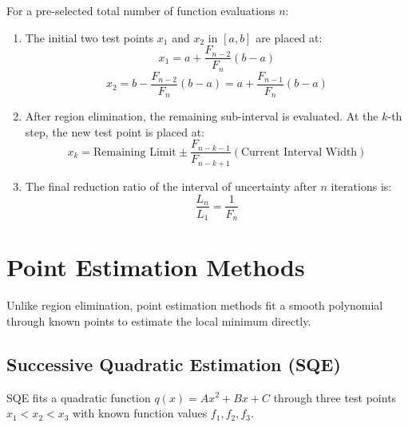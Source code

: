 \documentclass[12pt,a4paper]{article}
\begin{document}
\begin{tcolorbox}[formulabox, title={Fibonacci Search Equations}]
For a pre-selected total number of function evaluations $n$:
\begin{enumerate}[label=\textbf{\arabic*.}, leftmargin=*, itemsep=3pt, topsep=0pt]
  \item The initial two test points $x_1$ and $x_2$ in $[a, b]$ are placed at:
    \begin{equation}
      x_1 = a + \frac{F_{n-2}}{F_n}(b - a)
    \end{equation}
    \begin{equation}
      x_2 = b - \frac{F_{n-2}}{F_n}(b - a) = a + \frac{F_{n-1}}{F_n}(b - a)
    \end{equation}
  \item After region elimination, the remaining sub-interval is evaluated. At the $k$-th step, the new test point is placed at:
    \begin{equation}
      x_k = \text{Remaining Limit} \pm \frac{F_{n-k-1}}{F_{n-k+1}}(\text{Current Interval Width})
    \end{equation}
  \item The final reduction ratio of the interval of uncertainty after $n$ iterations is:
    \begin{equation}
      \frac{L_n}{L_1} = \frac{1}{F_n}
    \end{equation}
\end{enumerate}
\end{tcolorbox}

\section{Point Estimation Methods}

Unlike region elimination, point estimation methods fit a smooth polynomial through known points to estimate the local minimum directly.

\subsection{Successive Quadratic Estimation (SQE)}
SQE fits a quadratic function $q(x) = A x^2 + B x + C$ through three test points $x_1 < x_2 < x_3$ with known function values $f_1, f_2, f_3$.
\end{document}
